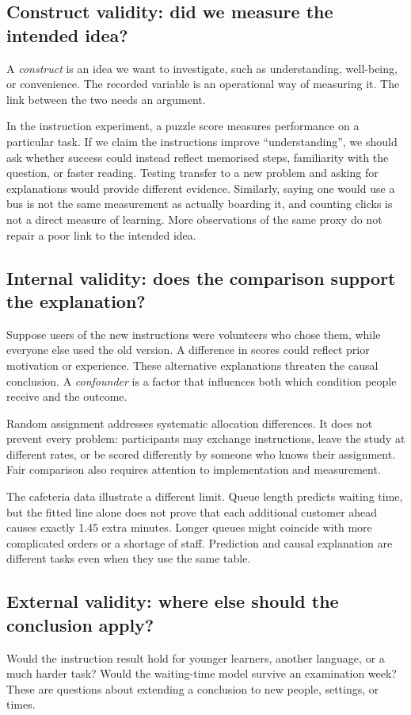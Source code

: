 \subsection{Construct validity: did we measure the intended idea?}
A \emph{construct} is an idea we want to investigate, such as understanding,
well-being, or convenience. The recorded variable is an operational way
of measuring it. The link between the two needs an argument.

In the instruction experiment, a puzzle score measures performance on a
particular task. If we claim the instructions improve ``understanding'',
we should ask whether success could instead reflect memorised steps,
familiarity with the question, or faster reading. Testing transfer to a
new problem and asking for explanations would provide different evidence.
Similarly, saying one would use a bus is not the same measurement as
actually boarding it, and counting clicks is not a direct measure of
learning. More observations of the same proxy do not repair a poor link
to the intended idea.

\subsection{Internal validity: does the comparison support the explanation?}
Suppose users of the new instructions were volunteers who chose them,
while everyone else used the old version. A difference in scores could
reflect prior motivation or experience. These alternative explanations
threaten the causal conclusion. A \emph{confounder} is a factor that
influences both which condition people receive and the outcome.

Random assignment addresses systematic allocation differences. It does
not prevent every problem: participants may exchange instructions,
leave the study at different rates, or be scored differently by someone
who knows their assignment. Fair comparison also requires attention to
implementation and measurement.

The cafeteria data illustrate a different limit. Queue length predicts
waiting time, but the fitted line alone does not prove that each additional
customer ahead causes exactly 1.45 extra minutes. Longer queues might
coincide with more complicated orders or a shortage of staff. Prediction and causal explanation are
different tasks even when they use the same table.

\subsection{External validity: where else should the conclusion apply?}
Would the instruction result hold for younger learners, another language,
or a much harder task? Would the waiting-time model survive an examination
week? These are questions about extending a conclusion to new people,
settings, or times.

